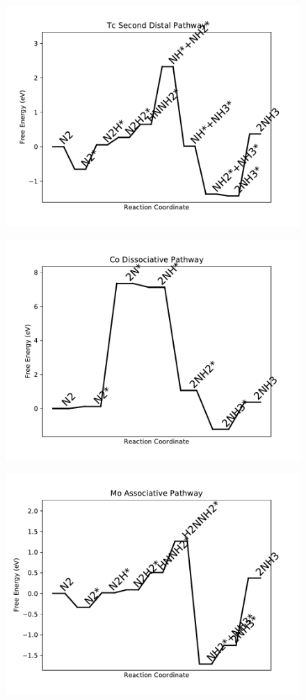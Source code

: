 \begin{figure}
\centering
\includegraphics[width=0.8\linewidth]{data/plots/Tc_distal_2.pdf}
\end{figure}

\begin{figure}
\centering
\includegraphics[width=0.8\linewidth]{data/plots/Co_dissociative.pdf}
\end{figure}

\begin{figure}
\centering
\includegraphics[width=0.8\linewidth]{data/plots/Mo_associative.pdf}
\end{figure}


